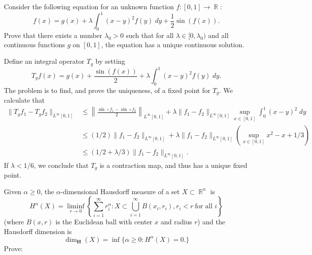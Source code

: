 \documentclass{exam}
\DeclareMathOperator{\RR}{\mathbb{R}}
\theoremstyle{problemstyle}
\newcommand{\1}[1]{\textbf{1}_{\left[#1\right]}} %
\begin{document}
\begin{questions}

\question Consider the following equation for an unknown function $f: [0,1] \to \RR$:
%
\[ f(x) = g(x) + \lambda \int_0^1 (x - y)^2 f(y)\; dy + \frac{1}{2} \sin(f(x)). \]
%
Prove that there exists a number $\lambda_0 > 0$ such that for all $\lambda \in [0,\lambda_0)$ and all continuous functions $g$ on $[0,1]$, the equation has a unique continuous solution.
\begin{solution}
	Define an integral operator $T_g$ by setting
	\[ T_g f(x) = g(x) + \frac{\sin(f(x))}{2} + \lambda \int_0^1 (x - y)^2 f(y)\; dy. \]
	The problem is to find, and prove the uniqueness, of a fixed point for $T_g$. We calculate that
	\begin{align*}
		\| T_g f_1 - T_g f_2 \|_{L^\infty[0,1]} &\leq \left\| \frac{\sin \circ f_1 - \sin \circ f_2}{2} \right\|_{L^\infty[0,1]} + \lambda \| f_1 - f_2 \|_{L^\infty[0,1]} \sup_{x \in [0,1]} \int_0^1 (x - y)^2\; dy\\
		&\leq (1/2) \| f_1 - f_2 \|_{L^\infty[0,1]} + \lambda \| f_1 - f_2 \|_{L^\infty[0,1]} \left( \sup_{x \in [0,1]} x^2 - x + 1/3 \right)\\
		&\leq (1/2 + \lambda / 3) \| f_1 - f_2 \|_{L^\infty[0,1]}.
	\end{align*}
	If $\lambda < 1/6$, we conclude that $T_g$ is a contraction map, and thus has a unique fixed point.
\end{solution}

\question Given $\alpha \geq 0$, the $\alpha$-dimensional Hausdorff measure of a set $X \subset \RR^n$ is
%
\[ H^\alpha(X) = \liminf_{r \to 0} \left\{ \sum_{i = 1}^\infty r_i^\alpha : X \subset \bigcup_{i = 1}^\infty B(x_i,r_i), r_i < r\ \text{for all $i$} \right\} \]
%
(where $B(x,r)$ is the Euclidean ball with center $x$ and radius $r$) and the Hausdorff dimension is
%
\[ \dim_{\mathbf{H}}(X) = \inf \{ \alpha \geq 0: H^\alpha(X) = 0. \} \]
%
Prove:
%
\begin{parts}

\end{parts}
\end{questions}
\end{document}
